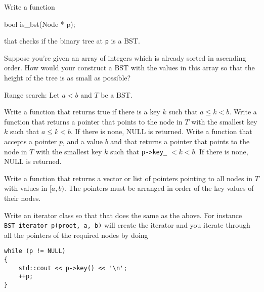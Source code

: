 \newpage
\begin{ex}
  Write a function
\begin{console}
bool is_bst(Node * p);
\end{console}
that checks if the binary tree at \verb!p! is a BST.
\end{ex}



\newpage
\begin{ex}
  Suppose you're given an array of integers which is already
  sorted in ascending order.
  How would your construct a BST with the values in this array
  so that the height of the tree is as small as possible?
\end{ex}



\newpage
\begin{ex}
  Range search:
  Let $a < b$ and $T$ be a BST.
  \begin{itemize}
    \li Write a function that returns true if there is a key
    $k$ such that $a \leq k < b$.
    \li Write a function that returns a pointer
    that points to the node in $T$
    with the smallest key $k$ such that
    $a \leq k < b$.
    If there is none, NULL is returned.
    \li Write a function that accepts a pointer $p$,
    and a value $b$ and that returns a pointer
    that points to the node in $T$
    with the smallest key $k$ such that
    \verb!p->key_! $< k < b$.
    If there is none, NULL is returned.
    
    \li Write a function that returns a vector or list of pointers
    pointing to all nodes in $T$ with values in $[a, b)$.
    The pointers must be arranged in order of the key values of their
    nodes.

    \li Write an iterator class so that that does the same as
    the above. For instance \verb!BST_iterator p(proot, a, b)!
    will create the iterator and you iterate through all the
    pointers of the required nodes by doing
    {\small
    \begin{Verbatim}[frame=single]
while (p != NULL)
{
    std::cout << p->key() << '\n';
    ++p;
}
    \end{Verbatim}
    }
  \end{itemize}
\end{ex}

